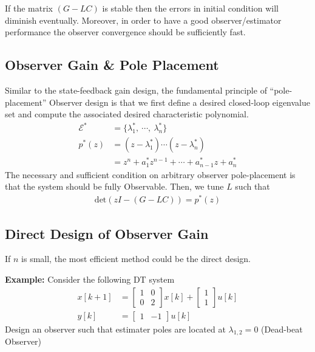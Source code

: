 \documentclass[twoside]{article}
\begin{document}
If the matrix $\left( G - L C \right)$ is stable then the errors in
initial condition will diminish eventually. Moreover, in order
to have a good observer/estimator performance the observer
convergence should be sufficiently fast. 

\newpage

\subsection{Observer Gain \& Pole Placement}

Similar to the state-feedback gain design,
the fundamental principle of ``pole-placement'' Observer design is that
we first define a desired closed-loop eigenvalue set and 
compute the associated desired characteristic polynomial. 
%
\begin{align*}
 \mathcal{E}^* &= \lbrace \lambda_1^* , \ \cdots, \  \lambda_n^*
                 \rbrace
  \\
  p^*(z) &= \left( z - \lambda_1^* \right) \cdots \left( z - \lambda_n^*
         \right)                         
  \\
  &= z^n + a_1^* z^{n-1} + \cdots + a_{n-1}^* z + a_n^*
\end{align*}
%
The necessary and sufficient condition on arbitrary observer pole-placement
is that the system should be fully Observable. Then, we tune $L$ such
that 
%
\begin{align*}
  \mathrm{det} \left( z I - ( G - L C ) \right) = p^*(z)
\end{align*}
%
\subsection*{Direct Design of Observer Gain}

If $n$ is small, the most efficient method could be the direct
design. 

\textbf{Example:} Consider the following DT system
%
\begin{align*}
 x[k+1] &= \left[ \begin{array}{cc} 1 & 0 \\ 0 & 2 \end{array} \right] x[k]
    + \left[ \begin{array}{c} 1 \\ 1 \end{array} \right] u[k]
\\
 y[k] &= \left[ \begin{array}{cc} 1 & -1 \end{array} \right] u[k]
\end{align*}
% 
Design an observer such that estimater poles are located at 
$\lambda_{1,2} = 0$ (Dead-beat Observer)
\end{document}
